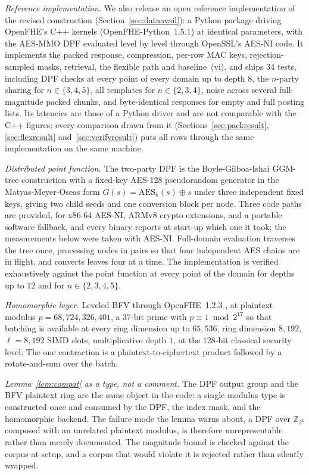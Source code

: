 \documentclass[a4paper,fleqn]{cas-dc}
\begin{document}
\emph{Reference implementation.} We also release an open reference
implementation of the revised construction (Section~\ref{sec:dataavail}): a
Python package driving OpenFHE's C++ kernels (OpenFHE-Python~1.5.1) at
identical parameters, with the AES-MMO DPF evaluated level by level through
OpenSSL's AES-NI code. It implements the packed response, compression,
per-row MAC keys, rejection-sampled masks, retrieval, the flexible path and
baseline~(vi), and ships $34$ tests, including DPF checks at every point of
every domain up to depth $8$, the $n$-party sharing for $n\in\{3,4,5\}$, all
templates for $n\in\{2,3,4\}$, noise across several full-magnitude packed
chunks, and byte-identical responses for empty and full posting lists. Its
latencies are those of a Python driver and are not comparable with the C++
figures; every comparison drawn from it (Sections~\ref{sec:packresult},
\ref{sec:flexresult} and~\ref{sec:verifyresult}) puts all rows through the
same implementation on the same machine.

\emph{Distributed point function.} The two-party DPF is the
Boyle-Gilboa-Ishai GGM-tree construction with a fixed-key AES-128
pseudorandom generator in the Matyas-Meyer-Oseas form
$G(s)=\mathrm{AES}_k(s)\oplus s$ under three independent fixed keys, giving
two child seeds and one conversion block per node. Three code paths are
provided, for x86-64 AES-NI, ARMv8 crypto extensions, and a portable
software fallback, and every binary reports at start-up which one it took; the
measurements below were taken with AES-NI. Full-domain evaluation traverses
the tree once, processing nodes in pairs so that four independent AES chains
are in flight, and converts leaves four at a time. The implementation is
verified exhaustively against the point function at every point of the domain
for depths up to $12$ and for $n\in\{2,3,4,5\}$.

\emph{Homomorphic layer.} Leveled BFV through OpenFHE~1.2.3
\citep{openfhe}, at plaintext modulus $p=68{,}724{,}326{,}401$, a $37$-bit
prime with $p\equiv 1 \bmod 2^{17}$ so that batching is available at every
ring dimension up to $65{,}536$, ring dimension $8{,}192$, $\ell=8{,}192$ SIMD
slots, multiplicative depth $1$, at the $128$-bit classical security level.
The one contraction is a plaintext-to-ciphertext product followed by a
rotate-and-sum over the batch.

\emph{Lemma~\ref{lem:compat} as a type, not a comment.} The DPF output group
and the BFV plaintext ring are the same object in the code: a single modulus
type is constructed once and consumed by the DPF, the index mask, and the
homomorphic backend. The failure mode the lemma warns about, a DPF over
$\mathbb{Z}_{2^k}$ composed with an unrelated plaintext modulus, is therefore
unrepresentable rather than merely documented. The magnitude bound is checked
against the corpus at setup, and a corpus that would violate it is rejected
rather than silently wrapped.
\end{document}
